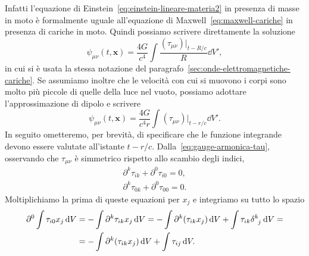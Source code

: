 Infatti l'equazione di Einstein~\eqref{eq:einstein-lineare-materia2} in presenza
di masse in moto è formalmente uguale all'equazione di
Maxwell~\eqref{eq:maxwell-cariche} in presenza di cariche in moto.  Quindi
possiamo scrivere direttamente la soluzione
\begin{equation}
  \psi_{\mu\nu}(t, \bm{x}) = \frac{4G}{c^{4}}\int \frac{(\tau_{\mu\nu})|_{t - R/c}}{R} \dd
  V',
\end{equation}
in cui si è usata la stessa notazione del
paragrafo~\ref{sec:onde-elettromagnetiche-cariche}. Se assumiamo inoltre che le
velocità con cui si muovono i corpi sono molto più piccole di quelle della luce
nel vuoto, possiamo adottare l'approssimazione di dipolo e scrivere
\begin{equation}
  \label{eq:psi-mu-nu}
  \psi_{\mu\nu}(t, \bm{x}) = \frac{4G}{c^{4}r} \int(\tau_{\mu\nu})|_{t-r/c} \dd V'.
\end{equation}
In seguito ometteremo, per brevità, di specificare che le funzione integrande
devono essere valutate all'istante $t-r/c$.
Dalla~\eqref{eq:gauge-armonica-tau}, osservando che $\tau_{\mu\nu}$ è simmetrico
rispetto allo scambio degli indici,
\begin{subequations}
  \begin{align}
    \label{eq:baz1}
    \partial^{k}\tau_{ik} + \partial^{0}\tau_{i0} = 0, \\
    \label{eq:baz2}
    \partial^{k}\tau_{0k} + \partial^{0}\tau_{00} = 0.
  \end{align}
\end{subequations}
Moltiplichiamo la prima di queste equazioni per $x_{j}$ e integriamo su tutto lo spazio
\begin{equation}
  \begin{split}
    \partial^{0} \int \tau_{i0} x_{j} \dd V &= -\int \partial^{k} \tau_{ik} x_{j}
    \dd V = - \int \partial^{k}(\tau_{ik} x_{j}) \dd V + \int \tau_{ik}
    \tensor{\delta}{^{k}_{j}} \dd V = \\
    &= - \int \partial^{k}(\tau_{ik} x_{j}) \dd V + \int \tau_{ij} \dd V.
  \end{split}
\end{equation}
